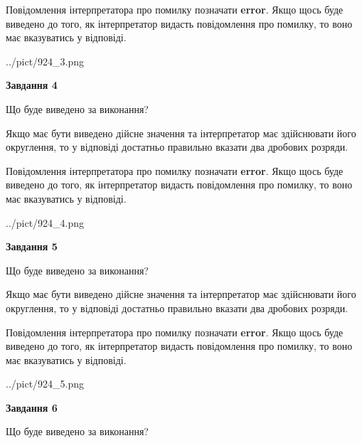 \documentclass[12pt, ukrainian]{article}
\begin{document}
{\begin {Large}
Повідомлення інтерпретатора про помилку позначати \textbf{error}.
Якщо щось буде виведено до того, як інтерпретатор видасть повідомлення про помилку, 
то воно має вказуватись у відповіді. \par

\begin{center}
	{../pict/924_3.png}
\end{center}
\newpage

{\begin {center}\textbf{Завдання 4}\end {center}}\par
Що буде виведено за виконання? \par

Якщо має бути виведено дійсне значення та інтерпретатор має здійснювати його округлення, 
то у відповіді достатньо правильно вказати два дробових розряди.

Повідомлення інтерпретатора про помилку позначати \textbf{error}.
Якщо щось буде виведено до того, як інтерпретатор видасть повідомлення про помилку, 
то воно має вказуватись у відповіді. \par

\begin{center}
	{../pict/924_4.png}
\end{center}
\newpage

{\begin {center}\textbf{Завдання 5}\end {center}}\par
Що буде виведено за виконання? \par

Якщо має бути виведено дійсне значення та інтерпретатор має здійснювати його округлення, 
то у відповіді достатньо правильно вказати два дробових розряди.

Повідомлення інтерпретатора про помилку позначати \textbf{error}.
Якщо щось буде виведено до того, як інтерпретатор видасть повідомлення про помилку, 
то воно має вказуватись у відповіді. \par

\begin{center}
	{../pict/924_5.png}
\end{center}
\newpage

{\begin {center}\textbf{Завдання 6}\end {center}}\par
Що буде виведено за виконання? \par


\end{Large}}
\end{document}

